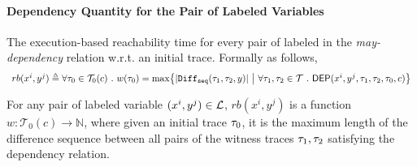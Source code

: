 \paragraph{Dependency Quantity for the Pair of Labeled Variables}
%
\begin{defn}
  \label{def:adapt-depvar_reachability}
  The execution-based reachability time for every pair of 
  labeled in the
  \emph{may-dependency} relation w.r.t. an initial trace. Formally as follows,
    \[
    \begin{array}{l}
        rb(x^i, y^j) \triangleq 
\forall \trace_0 \in \mathcal{T}_0(c) \sthat
  w (\trace_0) = \max \left\{ | \sdiff(\trace_1, \trace_2, y)|
  ~\middle\vert~
  \forall \trace_1, \trace_2 \in \mathcal{T} \sthat \dep(x^i, y^j,\trace_1, \trace_2, \trace_0, c) \right\}
\end{array}
\]
\end{defn}
%
For any pair of labeled variable $(x^i, y^j) \in \mathcal{L}$, 
$ rb(x^i, y^j)$ is a function $w: \mathcal{T}_0(c) \to \mathbb{N}$,
    where given an initial trace $\mathtt{\tau}_0$,
    it is the maximum length of the difference sequence between all pairs of the witness traces $\mathtt{\tau}_1, \mathtt{\tau}_2$ 
    satisfying the dependency relation.

